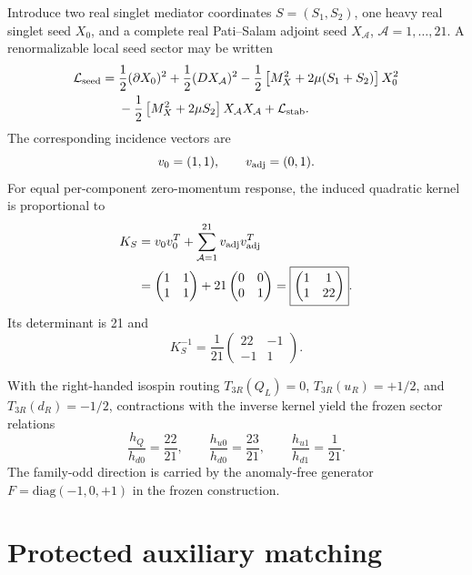 \documentclass[11pt]{article}
\begin{document}
Introduce two real singlet mediator coordinates $S=(S_1,S_2)$, one heavy real singlet seed $X_0$, and a complete real Pati--Salam adjoint seed $X_{\mathcal A}$, $\mathcal A=1,\ldots,21$. A renormalizable local seed sector may be written
\begin{align}
\mathcal L_{\rm seed}={}&
\frac12(\partial X_0)^2+\frac12(DX_{\mathcal A})^2
-\frac12\left[M_X^2+2\mu(S_1+S_2)\right]X_0^2 \nonumber\\
&-\frac12\left[M_X^2+2\mu S_2\right]X_{\mathcal A}X_{\mathcal A}
+\mathcal L_{\rm stab}.
\end{align}
The corresponding incidence vectors are
\begin{equation}
v_0=(1,1),\qquad v_{\rm adj}=(0,1).
\end{equation}
For equal per-component zero-momentum response, the induced quadratic kernel is proportional to
\begin{align}
K_S
&=v_0v_0^T+\sum_{\mathcal A=1}^{21}v_{\rm adj}v_{\rm adj}^T\\
&=\begin{pmatrix}1&1\\1&1\end{pmatrix}
+21\begin{pmatrix}0&0\\0&1\end{pmatrix}
=\boxed{\begin{pmatrix}1&1\\1&22\end{pmatrix}}.
\end{align}
Its determinant is 21 and
\begin{equation}
K_S^{-1}=\frac1{21}
\begin{pmatrix}22&-1\\-1&1\end{pmatrix}.
\end{equation}

With the right-handed isospin routing $T_{3R}(Q_L)=0$, $T_{3R}(u_R)=+1/2$, and $T_{3R}(d_R)=-1/2$, contractions with the inverse kernel yield the frozen sector relations
\begin{equation}
\boxed{
\frac{h_Q}{h_{d0}}=\frac{22}{21},\qquad
\frac{h_{u0}}{h_{d0}}=\frac{23}{21},\qquad
\frac{h_{u1}}{h_{d1}}=\frac1{21}.}
\end{equation}
The family-odd direction is carried by the anomaly-free generator $F=\mathrm{diag}(-1,0,+1)$ in the frozen construction.

\section{Protected auxiliary matching}
\end{document}

